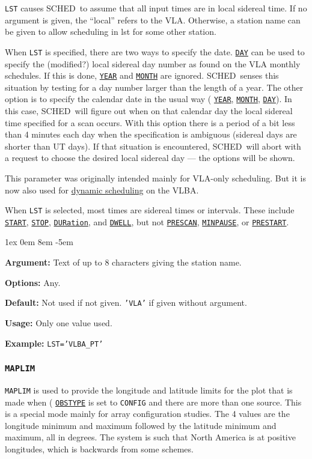 \documentclass{report}
\newcommand{\schedb}{{\sc SCHED~}}
\newcommand{\rcwbox}[5]{
  \begin{list}{}{\parsep 1ex  \itemsep 0em
                 \leftmargin 8em  \itemindent -5em }
    \item {\bf Argument:} #1
    \item {\bf Options:}  #2
    \item {\bf Default:}  #3
    \item {\bf Usage:}    #4
    \item {\bf Example:}  #5
  \end{list}
}
\begin{document}
{\tt LST} causes \schedb to assume that all input times
are in local sidereal time. If no argument is given, the ``local''
refers to the VLA. Otherwise, a station name can be given to allow
scheduling in lst for some other station.

When {\tt LST} is specified, there are two ways to specify the date.
{\hyperref[MP:DAY]{{\tt DAY}}} can be used to specify the (modified?)
local sidereal day number as found on the VLA monthly schedules.  If
this is done, 
{\hyperref[MP:YEAR]{{\tt YEAR}}} and 
{\hyperref[MP:MONTH]{{\tt MONTH}}}
are ignored. \schedb senses this situation by
testing for a day number larger than the length of a year.  The other
option is to specify the calendar date in the usual way (
{\hyperref[MP:YEAR]{{\tt YEAR}}}, 
{\hyperref[MP:MONTH]{{\tt MONTH}}}, 
{\hyperref[MP:DAY]{{\tt DAY}}}).
In this case, \schedb will figure out when on that
calendar day the local sidereal time specified for a scan occurs.
With this option there is a period of a bit less than 4 minutes each
day when the specification is ambiguous (sidereal days are shorter than
UT days).  If that situation is encountered, \schedb will abort with
a request to choose the desired local sidereal day --- the options
will be shown.

This parameter was originally intended mainly for VLA-only scheduling.
But it is now also used for 
{\hyperref[SSEC:DYNAMIC]{dynamic scheduling}}
on the VLBA.

When {\tt LST} is selected, most times are sidereal times or
intervals.  These include 
{\hyperref[MP:START]{{\tt START}}},
{\hyperref[MP:STOP]{{\tt STOP}}}, 
{\hyperref[MP:DUR]{{\tt DURation}}}, and
{\hyperref[MP:DWELL]{{\tt DWELL}}}, but not 
{\hyperref[MP:PRESCAN]{{\tt PRESCAN}}}, 
{\hyperref[MP:MINPAUSE]{{\tt MINPAUSE}}}, or
{\hyperref[MP:PRESTART]{{\tt PRESTART}}}.

\rcwbox
{Text of up to 8 characters giving the station name.}
{Any.}
{Not used if not given. {\tt 'VLA'} if given without argument.}
{Only one value used.}
{{\tt LST='VLBA\_PT'}}

\subsubsection{\label{MP:MAPLIM}{\tt MAPLIM}}

{\tt MAPLIM} is used to provide the longitude and latitude limits for
the plot that is made when (
{\hyperref[MP:OBSTYPE]{{\tt OBSTYPE}}} is
set to {\tt CONFIG} and there are more than one source.  This is
a special mode mainly for array configuration studies.  The 4
values are the longitude minimum and maximum followed by the
latitude minimum and maximum, all in degrees.  The system is such
that North America is at positive longitudes, which is backwards from
some schemes.
\end{document}

